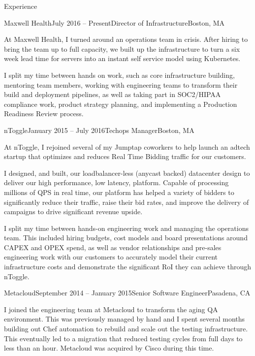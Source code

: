\documentclass{resume} %
\begin{document}

\begin{rSection}{Experience}

\begin{rSubsection}{Maxwell Health}{July 2016 -- Present}{Director of Infrastructure}{Boston, MA}
\item[] At Maxwell Health, I turned around an operations team in crisis.  After hiring
to bring the team up to full capacity, we built up the infrastructure to turn a six week
lead time for servers into an instant self service model using Kubernetes.

I split my time between hands on work, such as core infrastructure building,
mentoring team members, working with engineering teams to transform their
build and deployment pipelines, as well as taking part in SOC2/HIPAA compliance
work, product strategy planning, and implementing a Production Readiness Review
process.

\end{rSubsection}

\begin{rSubsection}{nToggle}{January 2015 -- July 2016}{Techops Manager}{Boston, MA}
\item[] At nToggle, I rejoined several of my Jumptap coworkers to help launch
an adtech startup that optimizes and reduces Real Time Bidding traffic for
our customers.

I designed, and built, our loadbalancer-less (anycast backed) datacenter design
to deliver our high performance, low latency, platform.  Capable of
processing millions of QPS in real time, our platform has helped a variety of
bidders to significantly reduce their traffic, raise their bid rates, and
improve the delivery of campaigns to drive significant revenue upside.  

I split my time between hands-on engineering work and managing the operations
team.  This included hiring budgets, cost models and board presentations around
CAPEX and OPEX spend, as well as vendor relationships and pre-sales engineering
work with our customers to accurately model their current infrastructure costs
and demonstrate the significant RoI they can achieve through nToggle.
\end{rSubsection}

\begin{rSubsection}{Metacloud}{September 2014 -- January 2015}{Senior Software Engineer}{Pasadena, CA}
\item[] I joined the engineering team at Metacloud to transform the aging QA environment.  This was previously managed by hand and I spent several months building out Chef automation to rebuild and scale out the testing infrastructure.  This eventually led to a migration that reduced testing cycles from full days to less than an hour.  Metacloud was acquired by Cisco during this time.
\end{rSubsection}


\end{rSection}
\end{document}
